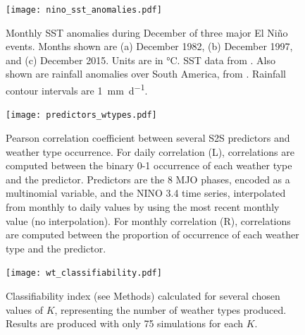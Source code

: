 \documentclass{article}
\begin{document}
\begin{figure}
	\texttt{[image: nino\_sst\_anomalies.pdf]}
	\caption{
		Monthly SST anomalies during December of three major El Ni\~{n}o events.
		Months shown are (a) December 1982, (b) December 1997, and (c) December 2015.
		Units are in \si{\celsius}.
		SST data from \citet{Reynolds2002}.
		Also shown are rainfall anomalies over South America, from \citet{Xie2010}.
		Rainfall contour intervals are \SI{1}{\milli\meter\per\day}.
	}
\end{figure}

\begin{figure}
	\texttt{[image: predictors\_wtypes.pdf]}
	\caption{
		Pearson correlation coefficient between several S2S predictors and weather type occurrence.
		For daily correlation (L), correlations are computed between the binary 0-1 occurrence of each weather type and the predictor.
		Predictors are the 8 MJO phases, encoded as a multinomial variable, and the NINO 3.4 time series, interpolated from monthly to daily values by using the most recent monthly value (no interpolation).
		For monthly correlation (R), correlations are computed between the proportion of occurrence of each weather type and the predictor.
	}
\end{figure}

\begin{figure}
	\texttt{[image: wt\_classifiability.pdf]}
	  \caption{
		  Classifiability index (see Methods) calculated for several chosen values of $K$, representing the number of weather types produced.
		  Results are produced with only 75 simulations for each $K$.
	  }
  \end{figure}

\clearpage


\end{document}
